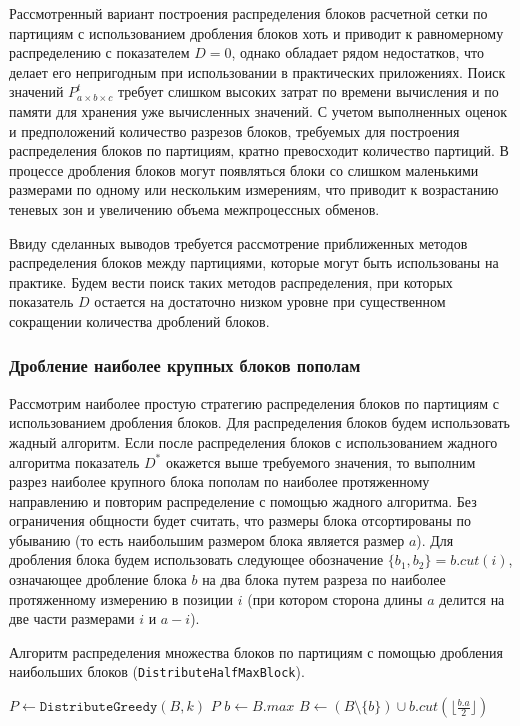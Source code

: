 Рассмотренный вариант построения распределения блоков расчетной сетки по партициям с использованием дробления блоков хоть и приводит к равномерному распределению с показателем $D = 0$, однако обладает рядом недостатков, что делает его непригодным при использовании в практических приложениях.
Поиск значений $P_{a \times b \times c}^t$ требует слишком высоких затрат по времени вычисления и по памяти для хранения уже вычисленных значений.
С учетом выполненных оценок и предположений количество разрезов блоков, требуемых для построения распределения блоков по партициям, кратно превосходит количество партиций.
В процессе дробления блоков могут появляться блоки со слишком маленькими размерами по одному или нескольким измерениям, что приводит к возрастанию теневых зон и увеличению объема межпроцессных обменов.

Ввиду сделанных выводов требуется рассмотрение приближенных методов распределения блоков между партициями, которые могут быть использованы на практике.
Будем вести поиск таких методов распределения, при которых показатель $D$ остается на достаточно низком уровне при существенном сокращении количества дроблений блоков.

\subsubsection{Дробление наиболее крупных блоков пополам}

Рассмотрим наиболее простую стратегию распределения блоков по партициям с использованием дробления блоков.
Для распределения блоков будем использовать жадный алгоритм.
Если после распределения блоков с использованием жадного алгоритма показатель $D^{*}$ окажется выше требуемого значения, то выполним разрез наиболее крупного блока пополам по наиболее протяженному направлению и повторим распределение с помощью жадного алгоритма.
Без ограничения общности будет считать, что размеры блока отсортированы по убыванию (то есть наибольшим размером блока является размер $a$).
Для дробления блока будем использовать следующее обозначение $\{b_1, b_2\} = b.cut(i)$, означающее дробление блока $b$ на два блока путем разреза по наиболее протяженному измерению в позиции $i$ (при котором сторона длины $a$ делится на две части размерами $i$ и $a - i$).

\begin{algo}\label{alg:par_distr_halfmaxblock}
Алгоритм распределения множества блоков по партициям с помощью дробления наибольших блоков (\texttt{DistributeHalfMaxBlock}).
\begin{algorithm}
\DontPrintSemicolon
{}
{
	{
		$P \leftarrow \texttt{DistributeGreedy}(B, k)$\;
		{
			\KwRet $P$\;
		}
		\Else
		{
			$b \leftarrow B.max$\;
			$B \leftarrow (B \setminus \{b\}) \cup b.cut(\lfloor \frac{b.a}{2} \rfloor)$\;
		}
	}
}
\end{algorithm}
\end{algo}

